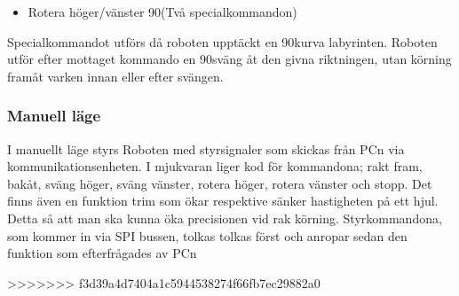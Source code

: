  \begin{itemize}
\item Rotera höger/vänster 90\degree (Två specialkommandon) 
\end{itemize}
Specialkommandot utförs då roboten upptäckt en 90\degree  kurva labyrinten. Roboten utför efter 
mottaget kommando en 90\degree sväng åt den givna riktningen, utan körning framåt varken innan 
eller efter svängen.




 

\subsubsection{Manuell läge}

I manuellt läge styrs Roboten med styrsignaler som skickas från PCn via 
kommunikationsenheten. I mjukvaran liger kod för kommandona; rakt 
fram, bakåt, sväng höger, sväng vänster, rotera höger, rotera vänster
och stopp. Det finns även en funktion trim som ökar respektive sänker 
hastigheten på ett hjul. Detta så att man ska kunna öka precisionen vid 
rak körning. Styrkommandona, som kommer in via SPI bussen, tolkas 
tolkas först och anropar sedan den funktion som efterfrågades av PCn

>>>>>>> f3d39a4d7404a1c5944538274f66fb7ec29882a0


	

